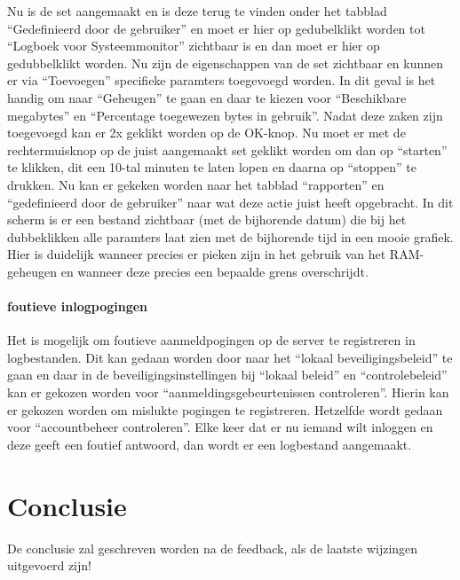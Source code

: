 \documentclass[pdftex,a4paper,12pt]{report}
\begin{document}
Nu is de set aangemaakt en is deze terug te vinden onder het tabblad "`Gedefinieerd door de gebruiker"' en moet er hier op gedubelklikt worden tot "`Logboek voor Systeemmonitor"' zichtbaar is en dan moet er hier op gedubbelklikt worden. Nu zijn de eigenschappen van de set zichtbaar en kunnen er via "`Toevoegen"' specifieke paramters toegevoegd worden. In dit geval is het handig om naar "`Geheugen"' te gaan en daar te kiezen voor "`Beschikbare megabytes"' en "`Percentage toegewezen bytes in gebruik"'.	Nadat deze zaken zijn toegevoegd kan er 2x geklikt worden op de OK-knop. Nu moet er met de rechtermuisknop op de juist aangemaakt set geklikt worden om dan op "`starten"' te klikken, dit een 10-tal minuten te laten lopen en daarna op "`stoppen"' te drukken. Nu kan er gekeken worden naar het tabblad "`rapporten"' en "`gedefinieerd door de gebruiker"' naar wat deze actie juist heeft opgebracht. In dit scherm is er een bestand zichtbaar (met de bijhorende datum) die bij het dubbeklikken alle paramters laat zien met de bijhorende tijd in een mooie grafiek. Hier is duidelijk wanneer precies er pieken zijn in het gebruik van het RAM-geheugen en wanneer deze precies een bepaalde grens overschrijdt.

\subsubsection{foutieve inlogpogingen}
Het is mogelijk om foutieve aanmeldpogingen op de server te registreren in logbestanden. Dit kan gedaan worden door naar het "`lokaal beveiligingsbeleid"' te gaan en daar in de beveiligingsinstellingen bij "`lokaal beleid"' en "`controlebeleid"' kan er gekozen worden voor "`aanmeldingsgebeurtenissen controleren"'. Hierin kan er gekozen worden om mislukte pogingen te registreren. Hetzelfde wordt gedaan voor "`accountbeheer controleren"'. Elke keer dat er nu iemand wilt inloggen en deze geeft een foutief antwoord, dan wordt er een logbestand aangemaakt. 

\chapter{Conclusie}
\label{ch:conclusie}

De conclusie zal geschreven worden na de feedback, als de laatste wijzingen uitgevoerd zijn!






\listoffigures
\listoftables
\end{document}
